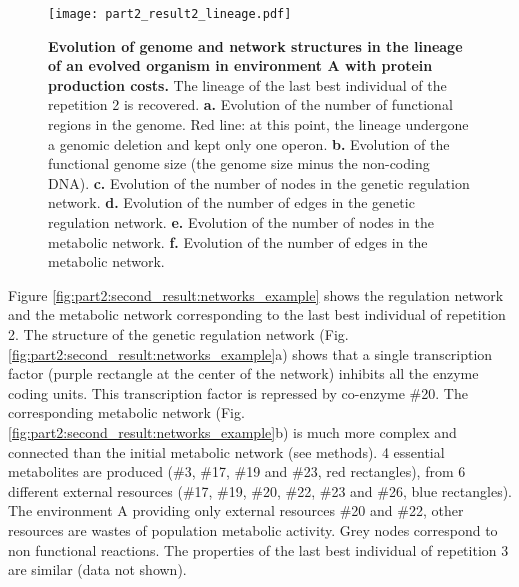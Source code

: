 \begin{figure}[!h]
\centering
\texttt{[image: part2\_result2\_lineage.pdf]}
\caption[Evolution of genome and network structures in the lineage of an evolved organism in environment A with protein production costs.]
{\textbf{Evolution of genome and network structures in the lineage of an evolved organism in environment A with protein production costs.}
The lineage of the last best individual of the repetition 2 is recovered.
\textbf{a.} Evolution of the number of functional regions in the genome. Red line: at this point, the lineage undergone a genomic deletion and kept only one operon.
\textbf{b.} Evolution of the functional genome size (the genome size minus the non-coding DNA).
\textbf{c.} Evolution of the number of nodes in the genetic regulation network.
\textbf{d.} Evolution of the number of edges in the genetic regulation network.
\textbf{e.} Evolution of the number of nodes in the metabolic network.
\textbf{f.} Evolution of the number of edges in the metabolic network.
}
\label{fig:part2:second_result:lineage}
\end{figure}

Figure \ref{fig:part2:second_result:networks_example} shows the regulation network and the metabolic network corresponding to the last best individual of repetition 2. The structure of the genetic regulation network (Fig. \ref{fig:part2:second_result:networks_example}a) shows that a single transcription factor (purple rectangle at the center of the network) inhibits all the enzyme coding units. This transcription factor is repressed by co-enzyme \#20. The corresponding metabolic network (Fig. \ref{fig:part2:second_result:networks_example}b) is much more complex and connected than the initial metabolic network (see methods). 4 essential metabolites are produced (\#3, \#17, \#19 and \#23, red rectangles), from 6 different external resources (\#17, \#19, \#20, \#22, \#23 and \#26, blue rectangles). The environment A providing only external resources \#20 and \#22, other resources are wastes of population metabolic activity. Grey nodes correspond to non functional reactions. The properties of the last best individual of repetition 3 are similar (data not shown).

